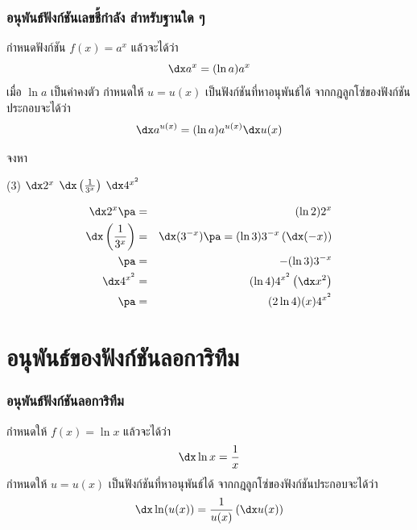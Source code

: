 \begin{frame}
\frametitle{อนุพันธ์ฟังก์ชันเลขชี้กำลัง สำหรับฐานใด ๆ}
\begin{thm}{}{}
กำหนดฟังก์ชัน $f(x) = a^x$ แล้วจะได้ว่า
\begin{equation} \label{eq:diff_exp_base_a}
\dx a^x = (\ln a)a^x
\end{equation}
เมื่อ $\ln a$ เป็นค่าคงตัว
\pa กำหนดให้ $u = u(x)$ เป็นฟังก์ชันที่หาอนุพันธ์ได้ \pa จากกฎลูกโซ่ของฟังก์ชันประกอบจะได้ว่า\pa 
\[ \dx a^{u(x)} = (\ln a)a^{u(x)} \dx u(x)\]
\end{thm}
\end{frame}


\begin{frame}[t]
\begin{ex}
จงหา
\begin{tasks}(3)
\task $\dx 2^{x}$
\task $\dx \left(\frac{1}{3^x}\right)$
\task $\dx 4^{x^2}$
\end{tasks}
\end{ex}
\begin{sol}
\begin{eqnarray*}
\dx 2^x \pa &=& (\ln 2)2^x \\
\dx \left(\frac{1}{3^x}\right) &=& \dx (3^{-x}) \pa = (\ln 3)3^{-x} \left( \dx (-x) \right) \\ 
\pa &=& -(\ln 3)3^{-x} \\
\dx 4^{x^2} &=& (\ln 4) 4^{x^2} \left( \dx x^2\right) \\
\pa &=& (2 \ln 4)(x)4^{x^2}
\end{eqnarray*}
\end{sol}
\end{frame}

\section[ลอการิทึม]{อนุพันธ์ของฟังก์ชันลอการิทึม}
\frame{\sectionpage}

\begin{frame}
\frametitle{อนุพันธ์ฟังก์ชันลอการิทึม}
\begin{thm}{}{}
กำหนดให้ $f(x) = \ln x$ แล้วจะได้ว่า \pa 
\begin{equation} \label{eq:diff_ln}
\dx \ln x = \frac{1}{x}
\end{equation}
\pa กำหนดให้ $u = u(x)$ เป็นฟังก์ชันที่หาอนุพันธ์ได้ จากกฎลูกโซ่ของฟังก์ชันประกอบจะได้ว่า \pa
\[ \dx \ln (u(x)) = \frac{1}{u(x)} \left(  \dx u(x) \right)\]
\end{thm}
\end{frame}



